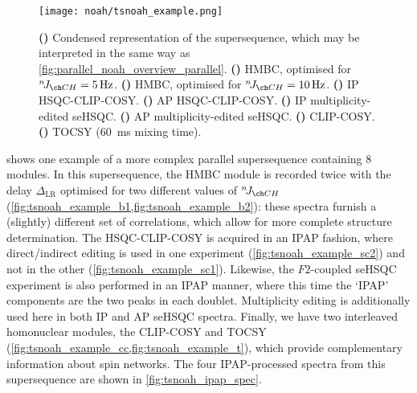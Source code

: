 \begin{figure}[!ht]
    \centering
    \texttt{[image: noah/tsnoah\_example.png]}%
    {\label{fig:tsnoah_example_overall}}%
    {\label{fig:tsnoah_example_b1}}%
    {\label{fig:tsnoah_example_b2}}%
    {\label{fig:tsnoah_example_sc1}}%
    {\label{fig:tsnoah_example_sc2}}%
    {\label{fig:tsnoah_example_s1}}%
    {\label{fig:tsnoah_example_s2}}%
    {\label{fig:tsnoah_example_cc}}%
    {\label{fig:tsnoah_example_t}}%
    \caption[Spectra from a NOAH-8 `parallel' supersequence]{
        \textbf{()} Condensed representation of the supersequence, which may be interpreted in the same way as \cref{fig:parallel_noah_overview_parallel}.
        \textbf{()} HMBC, optimised for $\nJ{CH} = \qty{5}{\Hz}$.
        \textbf{()} HMBC, optimised for $\nJ{CH} = \qty{10}{\Hz}$.
        \textbf{()} IP HSQC-CLIP-COSY.
        \textbf{()} AP HSQC-CLIP-COSY.
        \textbf{()} IP multiplicity-edited seHSQC.
        \textbf{()} AP multiplicity-edited seHSQC.
        \textbf{()} CLIP-COSY.
        \textbf{()} TOCSY (\qty{60}{\ms} mixing time).
    }
    \label{fig:tsnoah_example}
\end{figure}

 shows one example of a more complex parallel supersequence containing 8 modules.
In this supersequence, the HMBC module is recorded twice with the delay $\Delta_\text{LR}$ optimised for two different values of $\nJ{CH}$ (\cref{fig:tsnoah_example_b1,fig:tsnoah_example_b2}): these spectra furnish a (slightly) different set of correlations, which allow for more complete structure determination.
The HSQC-CLIP-COSY is acquired in an IPAP fashion, where direct/indirect editing is used in one experiment (\cref{fig:tsnoah_example_sc2}) and not in the other (\cref{fig:tsnoah_example_sc1}).
Likewise, the $F2$-coupled seHSQC experiment is also performed in an IPAP manner, where this time the `IPAP' components are the two peaks in each doublet.
Multiplicity editing is additionally used here in both IP and AP seHSQC spectra.
Finally, we have two interleaved homonuclear modules, the CLIP-COSY and TOCSY (\cref{fig:tsnoah_example_cc,fig:tsnoah_example_t}), which provide complementary information about spin networks.
The four IPAP-processed spectra from this supersequence are shown in \cref{fig:tsnoah_ipap_spec}.

